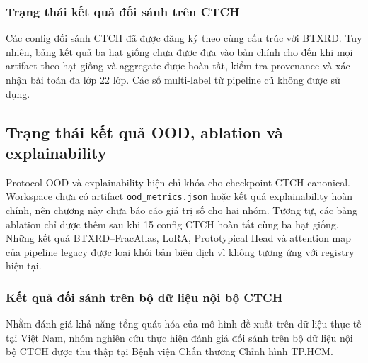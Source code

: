 \subsubsection{Trạng thái kết quả đối sánh trên CTCH}
Các config đối sánh CTCH đã được đăng ký theo cùng cấu trúc với BTXRD. Tuy
nhiên, bảng kết quả ba hạt giống chưa được đưa vào bản chính cho đến khi mọi artifact
theo hạt giống và aggregate được hoàn tất, kiểm tra provenance và xác nhận bài toán
đa lớp 22 lớp. Các số multi-label từ pipeline cũ không được sử dụng.

\subsection{Trạng thái kết quả OOD, ablation và explainability}
Protocol OOD và explainability hiện chỉ khóa cho checkpoint CTCH canonical.
Workspace chưa có artifact \texttt{ood\_metrics.json} hoặc kết quả explainability
hoàn chỉnh, nên chương này chưa báo cáo giá trị số cho hai nhóm. Tương tự, các
bảng ablation chỉ được thêm sau khi 15 config CTCH hoàn tất cùng ba hạt giống. Những
kết quả BTXRD--FracAtlas, LoRA, Prototypical Head và attention map của pipeline
legacy được loại khỏi bản biên dịch vì không tương ứng với registry hiện tại.

\iffalse
\subsubsection{Kết quả đối sánh trên bộ dữ liệu nội bộ CTCH}
Nhằm đánh giá khả năng tổng quát hóa của mô hình đề xuất trên dữ liệu thực tế tại Việt Nam, nhóm nghiên cứu thực hiện đánh giá đối sánh trên bộ dữ liệu nội bộ CTCH được thu thập tại Bệnh viện Chấn thương Chỉnh hình TP.HCM.


